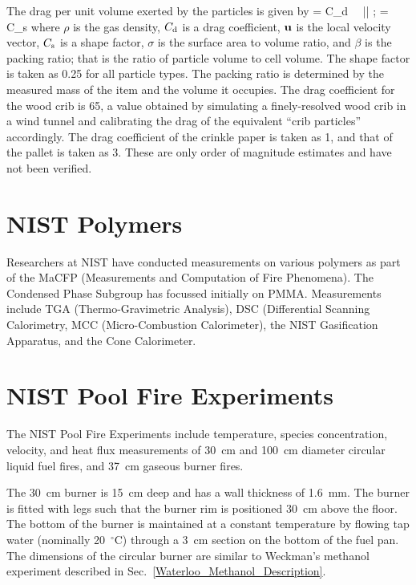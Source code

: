 The drag per unit volume exerted by the particles is given by
\be
    =  C_{\rm d} \, \kappa \, \bu |\bu|   \quad ; \quad \kappa = C_{\rm s} \sigma \beta
\ee
where $\rho$ is the gas density, $C_{\rm d}$ is a drag coefficient, ${\bf u}$ is the local velocity vector, $C_{\rm s}$ is a shape factor, $\sigma$ is the surface area to volume ratio, and $\beta$ is the packing ratio; that is the ratio of particle volume to cell volume. The shape factor is taken as 0.25 for all particle types. The packing ratio is determined by the measured mass of the item and the volume it occupies. The drag coefficient for the wood crib is 65, a value obtained by simulating a finely-resolved wood crib in a wind tunnel and calibrating the drag of the equivalent ``crib particles'' accordingly. The drag coefficient of the crinkle paper is taken as 1, and that of the pallet is taken as 3. These are only order of magnitude estimates and have not been verified.


\section{NIST Polymers}
\label{NIST_Polymers_Description}

Researchers at NIST have conducted measurements on various polymers as part of the MaCFP (Measurements and Computation of Fire Phenomena). The Condensed Phase Subgroup has focussed initially on PMMA. Measurements include TGA (Thermo-Gravimetric Analysis), DSC (Differential Scanning Calorimetry, MCC (Micro-Combustion Calorimeter), the NIST Gasification Apparatus, and the Cone Calorimeter.



\section{NIST Pool Fire Experiments}
\label{NIST_Pool_Fires_Description}

The NIST Pool Fire Experiments include temperature, species concentration, velocity, and heat flux measurements of 30~cm and 100~cm diameter circular liquid fuel fires, and 37~cm gaseous burner fires.

The 30~cm burner is 15~cm deep and has a wall thickness of 1.6~mm. The burner is fitted with legs such that the burner rim is positioned 30~cm above the floor. The bottom of the burner is maintained at a constant temperature by flowing tap water (nominally 20~$^\circ$C) through a 3~cm section on the bottom of the fuel pan. The dimensions of the circular burner are similar to Weckman's methanol experiment described in Sec.~\ref{Waterloo_Methanol_Description}.

